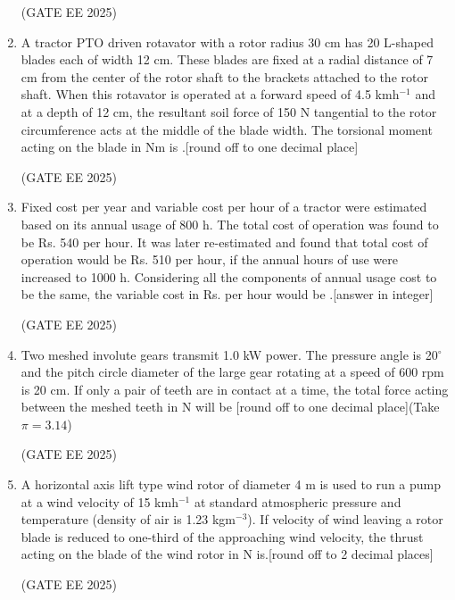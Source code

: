 \documentclass[journal,12pt,onecolumn]{IEEEtran}
\theoremstyle{remark}
\begin{document}
\begin{enumerate}
\hfill(GATE EE 2025)

\item A tractor PTO driven rotavator with a rotor radius 30 cm has 20 L-shaped blades each of width 12 cm. These blades are fixed at a radial distance of 7 cm from the center of the rotor shaft to the brackets attached to the rotor shaft. When this rotavator is operated at a forward speed of 4.5 kmh$^{-1}$ and at a depth of 12 cm, the resultant soil force of 150 N tangential to the rotor circumference acts at the middle of the blade width. The torsional moment acting on the blade in Nm is \underline{\hspace{2cm}}.{[round off to one decimal place]}

\hfill(GATE EE 2025)

\item Fixed cost per year and variable cost per hour of a tractor were estimated based on its annual usage of 800 h. The total cost of operation was found to be Rs. 540 per hour. It was later re-estimated and found that total cost of operation would be Rs. 510 per hour, if the annual hours of use were increased to 1000 h. Considering all the components of annual usage cost to be the same, the variable cost in Rs. per hour would be \underline{\hspace{2cm}}.{[answer in integer]}

\hfill(GATE EE 2025)

\item Two meshed involute gears transmit 1.0 kW power. The pressure angle is 20$^\circ$ and the pitch circle diameter of the large gear rotating at a speed of 600 rpm is 20 cm. If only a pair of teeth are in contact at a time, the total force acting between the meshed teeth in N will be \underline{\hspace{2cm}} {[round off to one decimal place]}(Take $\pi = 3.14$)

\hfill(GATE EE 2025)

\item A horizontal axis lift type wind rotor of diameter 4 m is used to run a pump at a wind velocity of 15 kmh$^{-1}$ at standard atmospheric pressure and temperature (density of air is 1.23 kgm$^{-3}$). If velocity of wind leaving a rotor blade is reduced to one-third of the approaching wind velocity, the thrust acting on the blade of the wind rotor in N is\underline{\hspace{2cm}}.{[round off to 2 decimal places]}

\hfill(GATE EE 2025)


\end{enumerate}
\end{document}
